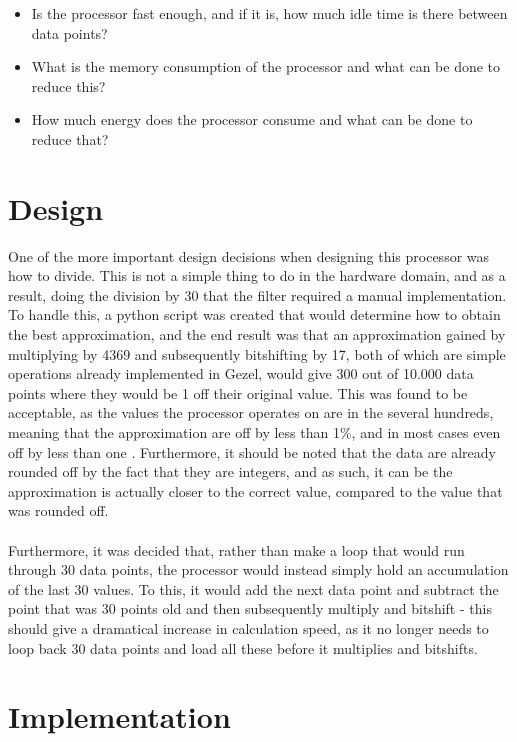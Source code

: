 \documentclass[12pt,a4paper]{article}
\begin{document}
	\begin{itemize}
		\item Is the processor fast enough, and if it is, how much idle time is there between data points?
		\item What is the memory consumption of the processor and what can be done to reduce this?
		\item How much energy does the processor consume and what can be done to reduce that?
	\end{itemize}
	
\section{Design}
One of the more important design decisions when designing this processor was how to divide. This is not a simple thing to do in the hardware domain, and as a result, doing the division by 30 that the filter required a manual implementation. To handle this, a python script was created that would determine how to obtain the best approximation, and the end result was that an approximation gained by multiplying by 4369 and subsequently bitshifting by 17, both of which are simple operations already implemented in Gezel, would give 300 out of 10.000 data points where they would be 1 off their original value. This was found to be acceptable, as the values the processor operates on are in the several hundreds, meaning that the approximation are off by less than 1\%, and in most cases even off by less than one \textperthousand. Furthermore, it should be noted that the data are already rounded off by the fact that they are integers, and as such, it can be the approximation is actually closer to the correct value, compared to the value that was rounded off.\\
\\
Furthermore, it was decided that, rather than make a loop that would run through 30 data points, the processor would instead simply hold an accumulation of the last 30 values. To this, it would add the next data point and subtract the point that was 30 points old and then subsequently multiply and bitshift - this should give a dramatical increase in calculation speed, as it no longer needs to loop back 30 data points and load all these before it multiplies and bitshifts.\\

\section{Implementation}
\end{document}
